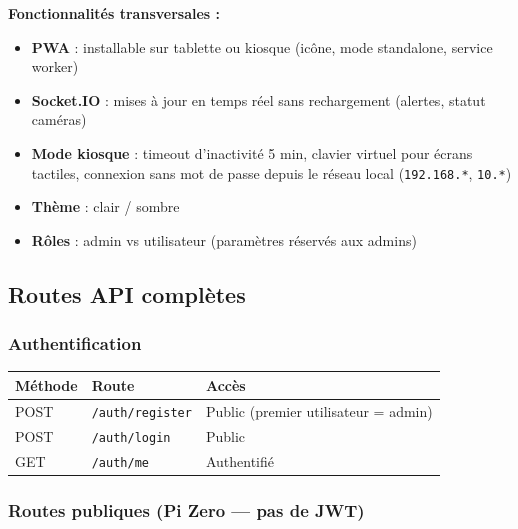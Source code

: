 \documentclass[12pt,a4paper]{article}
\begin{document}
\textbf{Fonctionnalités transversales :}
\begin{itemize}
  \item \textbf{PWA} : installable sur tablette ou kiosque (icône, mode standalone, service worker)
  \item \textbf{Socket.IO} : mises à jour en temps réel sans rechargement (alertes, statut caméras)
  \item \textbf{Mode kiosque} : timeout d'inactivité 5 min, clavier virtuel pour écrans tactiles,
    connexion sans mot de passe depuis le réseau local (\texttt{192.168.*}, \texttt{10.*})
  \item \textbf{Thème} : clair / sombre
  \item \textbf{Rôles} : admin vs utilisateur (paramètres réservés aux admins)
\end{itemize}

\subsection{Routes API complètes}

\subsubsection{Authentification}

\begin{longtable}{|l|l|l|}
\hline
\textbf{Méthode} & \textbf{Route} & \textbf{Accès} \\
\hline
\endhead
\hline
\endfoot
POST & \texttt{/auth/register} & Public (premier utilisateur = admin) \\
POST & \texttt{/auth/login} & Public \\
GET & \texttt{/auth/me} & Authentifié \\
\hline
\end{longtable}

\subsubsection{Routes publiques (Pi Zero — pas de JWT)}
\end{document}
